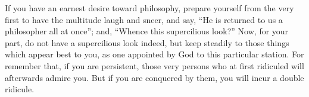 If you have an earnest desire toward philosophy, prepare yourself from
the very first to have the multitude laugh and sneer, and say, ``He is
returned to us a philosopher all at once''; and, ``Whence this supercilious
look?'' Now, for your part, do not have a supercilious look indeed, but
keep steadily to those things which appear best to you, as one appointed
by God to this particular station. For remember that, if you are
persistent, those very persons who at first ridiculed will afterwards
admire you. But if you are conquered by them, you will incur a double
ridicule.
